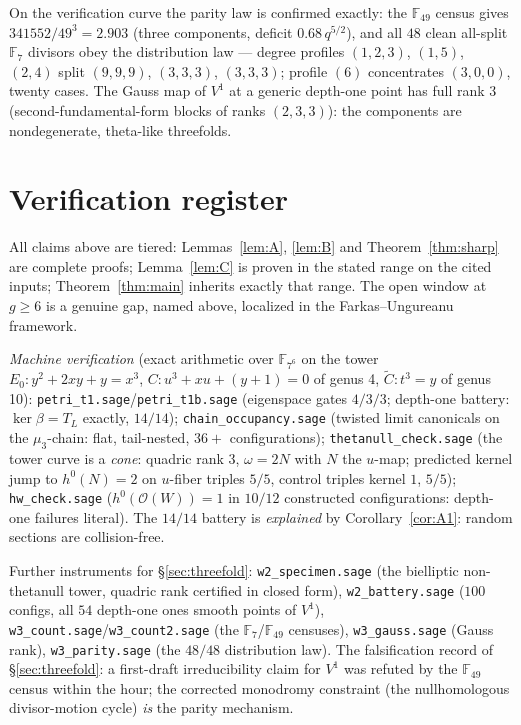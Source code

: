 \documentclass[11pt]{article}
\newcommand{\OO}{\mathcal{O}}
\begin{document}
On the verification curve the parity law is confirmed exactly: the
$\mathbb F_{49}$ census gives $341552/49^3=2.903$ (three components,
deficit $0.68\,q^{5/2}$), and all $48$ clean all-split $\mathbb F_7$
divisors obey the distribution law — degree profiles $(1,2,3)$, $(1,5)$,
$(2,4)$ split $(9,9,9)$, $(3,3,3)$, $(3,3,3)$; profile $(6)$ concentrates
$(3,0,0)$, twenty cases.  The Gauss map of $V^1$ at a generic depth-one
point has full rank $3$ (second-fundamental-form blocks of ranks
$(2,3,3)$): the components are nondegenerate, theta-like threefolds.

\section{Verification register}\label{sec:register}

All claims above are tiered: Lemmas~\ref{lem:A}, \ref{lem:B} and
Theorem~\ref{thm:sharp} are complete proofs; Lemma~\ref{lem:C} is proven in the
stated range on the cited inputs; Theorem~\ref{thm:main} inherits exactly that
range.  The open window at $g\ge6$ is a genuine gap, named above, localized in the
Farkas--Ungureanu framework.

\emph{Machine verification} (exact arithmetic over $\mathbb F_{7^6}$ on the tower
$E_0\!: y^2+2xy+y=x^3$, $C\!: u^3+xu+(y+1)=0$ of genus 4,
$\widetilde C\!: t^3=y$ of genus 10):
\texttt{petri\_t1.sage}/\texttt{petri\_t1b.sage} (eigenspace gates $4/3/3$;
depth-one battery: $\ker\beta=T_L$ exactly, $14/14$);
\texttt{chain\_occupancy.sage} (twisted limit canonicals on the $\mu_3$-chain:
flat, tail-nested, $36+$ configurations);
\texttt{thetanull\_check.sage} (the tower curve is a \emph{cone}: quadric rank 3,
$\omega=2N$ with $N$ the $u$-map; predicted kernel jump to $h^0(N)=2$ on $u$-fiber
triples $5/5$, control triples kernel $1$, $5/5$);
\texttt{hw\_check.sage} ($h^0(\OO(W))=1$ in $10/12$ constructed configurations:
depth-one failures literal).  The $14/14$ battery is \emph{explained} by
Corollary~\ref{cor:A1}: random sections are collision-free.

Further instruments for \S\ref{sec:threefold}: \texttt{w2\_specimen.sage}
(the bielliptic non-thetanull tower, quadric rank certified in closed
form), \texttt{w2\_battery.sage} ($100$ configs, all $54$ depth-one ones
smooth points of $V^1$), \texttt{w3\_count.sage}/\texttt{w3\_count2.sage}
(the $\mathbb F_7$/$\mathbb F_{49}$ censuses), \texttt{w3\_gauss.sage}
(Gauss rank), \texttt{w3\_parity.sage} (the $48/48$ distribution law).
The falsification record of \S\ref{sec:threefold}: a first-draft
irreducibility claim for $V^1$ was refuted by the $\mathbb F_{49}$ census
within the hour; the corrected monodromy constraint (the nullhomologous
divisor-motion cycle) \emph{is} the parity mechanism.
\end{document}
